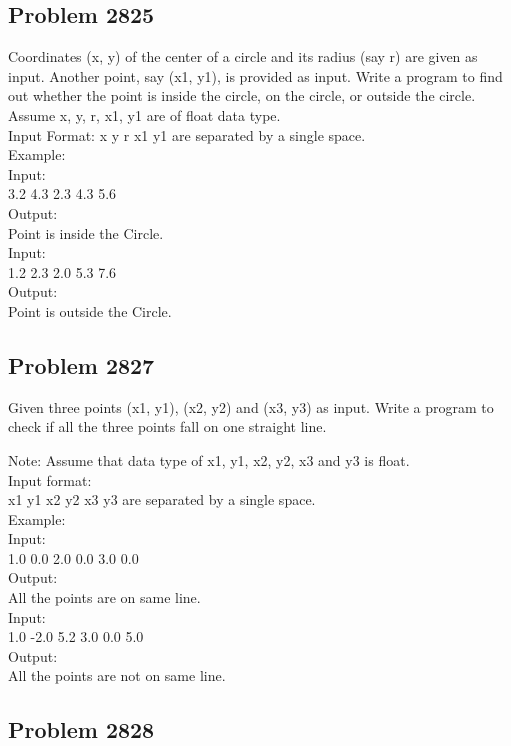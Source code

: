 \subsection{Problem 2825}

Coordinates (x, y) of the center of a circle and its radius (say r) are given as input. Another point, say (x1, y1),  is provided as input. Write a program to find out whether the point is inside the circle, on the circle, or outside the circle. Assume x, y, r, x1, y1 are of float data type.
\\Input Format: x y r x1 y1 are separated by a single space.
\\Example:
\\Input:
\\3.2 4.3 2.3 4.3 5.6
\\Output:
\\Point is inside the Circle.
\\Input:
\\1.2 2.3 2.0 5.3 7.6
\\Output:
\\Point is outside the Circle.

\subsection{Problem 2827}

Given three points (x1, y1), (x2, y2) and (x3, y3) as input. Write a program to check if all the three points fall on one straight line.

Note: Assume that data type of x1, y1, x2, y2, x3 and y3 is float.
\\Input format:
\\x1 y1 x2 y2 x3 y3 are separated by a single space.
\\Example:
\\Input:
\\1.0 0.0 2.0 0.0 3.0 0.0
\\Output:
\\All the points are on same line.
\\Input:
\\1.0 -2.0 5.2 3.0 0.0 5.0
\\Output:
\\All the points are not on same line.

\subsection{Problem 2828}

